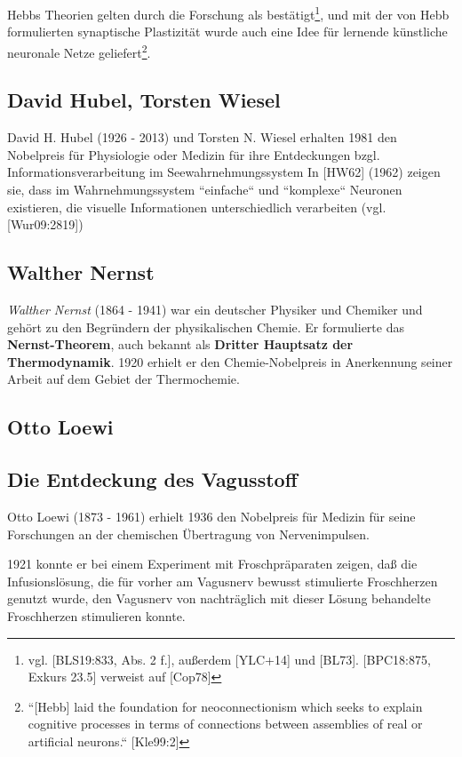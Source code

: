 Hebbs Theorien gelten durch die Forschung als bestätigt\footnote{
vgl. [BLS19:833, Abs. 2 f.], außerdem [YLC+14] und [BL73]. [BPC18:875, Exkurs 23.5] verweist auf [Cop78]
}, und mit der von Hebb formulierten synaptische Plastizität wurde auch eine Idee für lernende künstliche neuronale Netze geliefert\footnote{
``[Hebb] laid the foundation for neoconnectionism which seeks to explain cognitive processes in terms of connections between assemblies of real or artificial neurons.`` [Kle99:2]
}.


\subsection{David Hubel, Torsten Wiesel}\label{appendix:hubelwiesel}

David H. Hubel (1926 - 2013) und Torsten N. Wiesel erhalten 1981 den Nobelpreis für Physiologie oder Medizin  für ihre Entdeckungen bzgl. Informationsverarbeitung im Seewahrnehmungssystem
In [HW62] (1962) zeigen sie, dass im Wahrnehmungssystem ``einfache`` und ``komplexe`` Neuronen existieren, die visuelle Informationen unterschiedlich verarbeiten (vgl. [Wur09:2819])

\subsection{Walther Nernst}
\textit{Walther Nernst} (1864 - 1941) war ein deutscher Physiker und Chemiker und gehört zu den Begründern der physikalischen Chemie. Er formulierte das \textbf{Nernst-Theorem}, auch bekannt als \textbf{Dritter Hauptsatz der Thermodynamik}. 1920 erhielt er den Chemie-Nobelpreis in Anerkennung seiner Arbeit auf dem Gebiet der Thermochemie.


\subsection{Otto Loewi}
\subsection*{Die Entdeckung des Vagusstoff}

Otto Loewi (1873 - 1961) erhielt 1936 den Nobelpreis für Medizin für seine Forschungen an der chemischen Übertragung von Nervenimpulsen.

1921 konnte er bei einem Experiment mit Froschpräparaten zeigen, daß die Infusionslösung, die für vorher am Vagusnerv bewusst stimulierte Froschherzen genutzt wurde, den Vagusnerv von nachträglich mit dieser Lösung behandelte Froschherzen stimulieren konnte.

